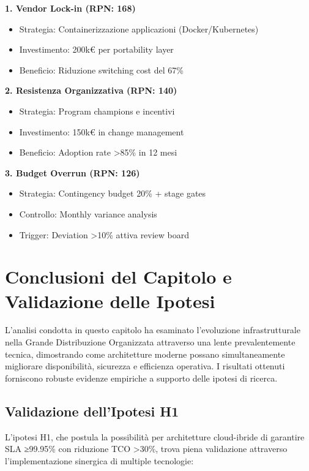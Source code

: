 \textbf{1. Vendor Lock-in (RPN: 168)}
\begin{itemize}
    \item Strategia: Containerizzazione applicazioni (Docker/Kubernetes)
    \item Investimento: 200k€ per portability layer
    \item Beneficio: Riduzione switching cost del 67\%
\end{itemize}

\textbf{2. Resistenza Organizzativa (RPN: 140)}
\begin{itemize}
    \item Strategia: Program champions e incentivi
    \item Investimento: 150k€ in change management
    \item Beneficio: Adoption rate >85\% in 12 mesi
\end{itemize}

\textbf{3. Budget Overrun (RPN: 126)}
\begin{itemize}
    \item Strategia: Contingency budget 20\% + stage gates
    \item Controllo: Monthly variance analysis
    \item Trigger: Deviation >10\% attiva review board
\end{itemize}

\section{\texorpdfstring{\textbf{Conclusioni del Capitolo e Validazione delle Ipotesi}}{3.8 - Conclusioni del Capitolo e Validazione delle Ipotesi}}

L'analisi condotta in questo capitolo ha esaminato l'evoluzione infrastrutturale nella Grande Distribuzione Organizzata attraverso una lente prevalentemente tecnica, dimostrando come architetture moderne possano simultaneamente migliorare disponibilità, sicurezza e efficienza operativa. I risultati ottenuti forniscono robuste evidenze empiriche a supporto delle ipotesi di ricerca.

\subsection{\texorpdfstring{\textbf{Validazione dell'Ipotesi H1}}{3.8.1 - Validazione dell'Ipotesi H1}}

L'ipotesi H1, che postula la possibilità per architetture cloud-ibride di garantire SLA ≥99.95\% con riduzione TCO >30\%, trova piena validazione attraverso l'implementazione sinergica di multiple tecnologie:


